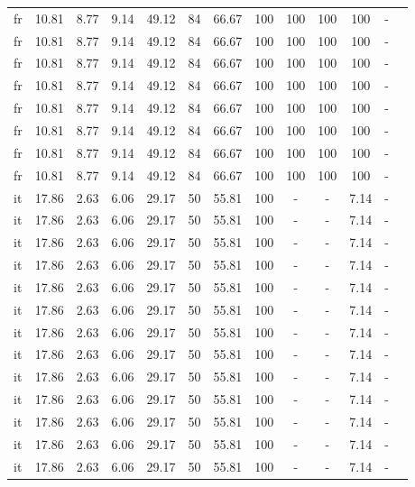 \begin{table}[H]
\begin{tabularx}{\textwidth}{Xcccccccccccc}
            fr & 10.81 & 8.77 & 9.14 & 49.12 & 84 & 66.67 & 100 & 100 & 100 & 100 & - \\
            fr & 10.81 & 8.77 & 9.14 & 49.12 & 84 & 66.67 & 100 & 100 & 100 & 100 & - \\
            fr & 10.81 & 8.77 & 9.14 & 49.12 & 84 & 66.67 & 100 & 100 & 100 & 100 & - \\
            fr & 10.81 & 8.77 & 9.14 & 49.12 & 84 & 66.67 & 100 & 100 & 100 & 100 & - \\
            fr & 10.81 & 8.77 & 9.14 & 49.12 & 84 & 66.67 & 100 & 100 & 100 & 100 & - \\
            fr & 10.81 & 8.77 & 9.14 & 49.12 & 84 & 66.67 & 100 & 100 & 100 & 100 & - \\
            fr & 10.81 & 8.77 & 9.14 & 49.12 & 84 & 66.67 & 100 & 100 & 100 & 100 & - \\
            fr & 10.81 & 8.77 & 9.14 & 49.12 & 84 & 66.67 & 100 & 100 & 100 & 100 & - \\
            it & 17.86 & 2.63 & 6.06 & 29.17 & 50 & 55.81 & 100 & - & - & 7.14 & - \\
            it & 17.86 & 2.63 & 6.06 & 29.17 & 50 & 55.81 & 100 & - & - & 7.14 & - \\
            it & 17.86 & 2.63 & 6.06 & 29.17 & 50 & 55.81 & 100 & - & - & 7.14 & - \\
            it & 17.86 & 2.63 & 6.06 & 29.17 & 50 & 55.81 & 100 & - & - & 7.14 & - \\
            it & 17.86 & 2.63 & 6.06 & 29.17 & 50 & 55.81 & 100 & - & - & 7.14 & - \\
            it & 17.86 & 2.63 & 6.06 & 29.17 & 50 & 55.81 & 100 & - & - & 7.14 & - \\
            it & 17.86 & 2.63 & 6.06 & 29.17 & 50 & 55.81 & 100 & - & - & 7.14 & - \\
            it & 17.86 & 2.63 & 6.06 & 29.17 & 50 & 55.81 & 100 & - & - & 7.14 & - \\
            it & 17.86 & 2.63 & 6.06 & 29.17 & 50 & 55.81 & 100 & - & - & 7.14 & - \\
            it & 17.86 & 2.63 & 6.06 & 29.17 & 50 & 55.81 & 100 & - & - & 7.14 & - \\
            it & 17.86 & 2.63 & 6.06 & 29.17 & 50 & 55.81 & 100 & - & - & 7.14 & - \\
            it & 17.86 & 2.63 & 6.06 & 29.17 & 50 & 55.81 & 100 & - & - & 7.14 & - \\
            it & 17.86 & 2.63 & 6.06 & 29.17 & 50 & 55.81 & 100 & - & - & 7.14 & - \\

\end{tabularx}
\end{table}
